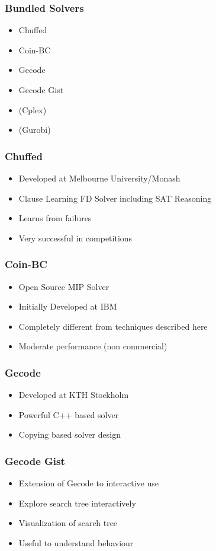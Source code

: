 \begin{frame}
  \frametitle{Bundled Solvers}
  \begin{itemize}
  \item Chuffed
  \item Coin-BC
  \item Gecode
  \item Gecode Gist
  \item (Cplex)
  \item (Gurobi)   
  \end{itemize}
\end{frame}

\begin{frame}
  \frametitle{Chuffed}
  \begin{itemize}
  \item Developed at Melbourne University/Monash
  \item Clause Learning FD Solver including SAT Reasoning
  \item Learns from failures
    \item Very successful in competitions
  \end{itemize}
\end{frame}

\begin{frame}
  \frametitle{Coin-BC}
  \begin{itemize}
  \item Open Source MIP Solver
    \item Initially Developed at IBM
  \item Completely different from techniques described here
    \item Moderate performance (non commercial)
  \end{itemize}
\end{frame}

\begin{frame}
  \frametitle{Gecode}
  \begin{itemize}
  \item Developed at KTH Stockholm
  \item Powerful C++ based solver
  \item Copying based solver design
  \end{itemize}
\end{frame}

\begin{frame}
  \frametitle{Gecode Gist}
  \begin{itemize}
  \item Extension of Gecode to interactive use
  \item Explore search tree interactively
  \item Visualization of search tree
    \item Useful to understand behaviour
  \end{itemize}
\end{frame}

